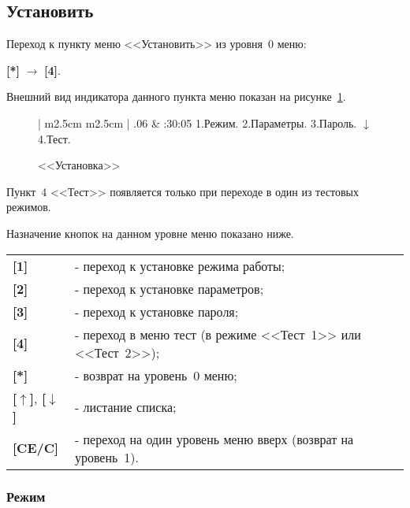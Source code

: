 \subsection{Установить} \label{ssec:setup}

Переход к пункту меню <<Установить>> из уровня~0 меню: 

\textbf{[*]} $\rightarrow$ \textbf{[4]}.

Внешний вид индикатора данного пункта меню показан на рисунке~\ref{fig:setup}.
 
 \begin{figure}[H]
 	\centering
 	
	\begin{tabular}{| m{2.5cm}  m{2.5cm} |}
		.06	& :30:05		\tabularnewline 
		 {1.Режим.} 		\tabularnewline
		 {2.Параметры.} 	\tabularnewline 
		 {3.Пароль.}		\tabularnewline \hline
		 {$\downarrow$}		\tabularnewline
		 {4.Тест.} 			\tabularnewline 
		\lasthline
	\end{tabular} 
	
	\caption{<<Установка>>}
	\label{fig:setup}
\end{figure}

Пункт~4 <<Тест>> появляется только при переходе в один из тестовых режимов. 

Назначение кнопок на данном уровне меню показано ниже.
\begin{center}
	\begin{tabular}{p{2cm} p{15cm}}
		\textbf{[1]} & - переход к установке режима работы;	\tabularnewline 
		\textbf{[2]} & - переход к установке параметров; \tabularnewline 
		\textbf{[3]} & - переход к установке пароля; \tabularnewline 
		\textbf{[4]} & - переход в меню тест (в режиме <<Тест~1>> или <<Тест~2>>); \tabularnewline 
		\textbf{[*]} & - возврат на уровень~0 меню; \tabularnewline
		\textbf{[$\uparrow$]}, \textbf{[$\downarrow$]}  & - листание списка; \tabularnewline
		\textbf{[CE/C]} & - переход на один уровень меню вверх (возврат на уровень~1). \tabularnewline				
	\end{tabular} 
\end{center}


\subsubsection{Режим} \label{sssec:setup_regime}

